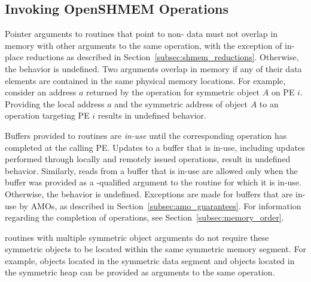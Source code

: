 
\subsection{Invoking OpenSHMEM Operations}\label{subsec:invoking_openshmem_operations}

Pointer arguments to \openshmem routines that point to non- data must not
overlap in memory with other arguments to the same \openshmem operation, with
the exception of in-place reductions as described in Section~\ref{subsec:shmem_reductions}.
Otherwise, the behavior is undefined.  Two arguments overlap in memory if any
of their data elements are contained in the same physical memory locations.
For example, consider an address $a$ returned by the  operation
for symmetric object $A$ on \ac{PE} $i$.  Providing the local address $a$ and
the symmetric address of object $A$ to an \openshmem operation targeting
\ac{PE} $i$ results in undefined behavior.

Buffers provided to \openshmem routines are \emph{in-use} until the
corresponding \openshmem operation has completed at the calling \ac{PE}.
Updates to a buffer that is in-use, including updates performed through locally
and remotely issued \openshmem operations, result in undefined behavior.
Similarly, reads from a buffer that is in-use are allowed only when the buffer
was provided as a -qualified argument to the \openshmem routine for
which it is in-use.  Otherwise, the behavior is undefined. Exceptions are made for
buffers that are in-use by \acp{AMO}, as described in
Section~\ref{subsec:amo_guarantees}. For information regarding the completion
of \openshmem operations, see Section~\ref{subsec:memory_order}.

\openshmem routines with multiple symmetric object arguments do not require
these symmetric objects to be located within the same symmetric memory segment.
For example, objects located in the symmetric data segment and objects located
in the symmetric heap can be provided as arguments to the same \openshmem
operation.
